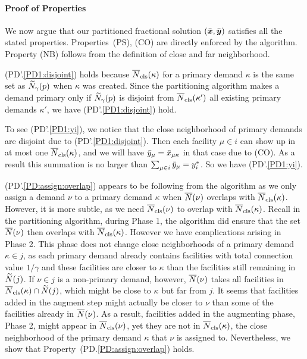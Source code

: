 
\medskip
\paragraph{Proof of Properties}
We now argue that our partitioned fractional solution $(\bar{\boldsymbol{x}},\bar{\boldsymbol{y}})$
satisfies all the stated properties. Properties~(PS), (CO) are
directly enforced by the algorithm. Property (NB) follows from the
definition of close and far neighborhood.

(PD'.\ref{PD1:disjoint}) holds because ${\overline{N}}_{\text{cls}}(\kappa)$ for a
primary demand $\kappa$ is the same set as ${\widetilde N}_{\gamma}(p)$ when
$\kappa$ was created. Since the partitioning algorithm makes a demand
primary only if ${\widetilde N}_{\gamma}(p)$ is disjoint from
${\overline{N}}_{\text{cls}}(\kappa')$ all existing primary demands $\kappa'$, we have
(PD'.\ref{PD1:disjoint}) hold.

To see (PD'.\ref{PD1:yi}), we notice that the close neighborhood of
primary demands are disjoint due to (PD'.\ref{PD1:disjoint}). Then
each facility $\mu \in i$ can show up in at most one
${\overline{N}}_{\text{cls}}(\kappa)$, and we will have ${\bar y}_{\mu} =
{\bar x}_{\mu\kappa}$ in that case due to (CO). As a result this
summation is no larger than $\sum_{\mu\in i}{\bar y}_{\mu} =
y_i^\ast$. So we have (PD'.\ref{PD1:yi}).

(PD'.\ref{PD:assign:overlap}) appears to be following from the
algorithm as we only assign a demand $\nu$ to a primary demand
$\kappa$ when ${\overline{N}}(\nu)$ overlaps with
${\overline{N}}_{\text{cls}}(\kappa)$. However, it is more subtle, as we need
${\overline{N}}_{\text{cls}}(\nu)$ to overlap with ${\overline{N}}_{\text{cls}}(\kappa)$. Recall in the
partitioning algorithm, during Phase 1, the algorithm did ensure that
the set ${\overline{N}}(\nu)$ then overlaps with ${\overline{N}}_{\text{cls}}(\kappa)$. However
we have complications arising in Phase 2. This phase does not change
close neighborhoods of a primary demand $\kappa\in j$, as each primary
demand already contains facilities with total connection value
$1/\gamma$ and these facilities are closer to $\kappa$ than the
facilities still remaining in ${\widetilde N}(j)$. If $\nu\in j$ is a
non-primary demand, however, ${\overline{N}}(\nu)$ takes all facilities in
${\overline{N}}_{\text{cls}}(\kappa)\cap {\widetilde N}(j)$, which might be close to $\kappa$
but far from $j$.  It seems that facilities added in the augment step
might actually be closer to $\nu$ than some of the facilities already
in ${\overline{N}}(\nu)$. As a result, facilities added in the augmenting
phase, Phase 2, might appear in ${\overline{N}}_{\text{cls}}(\nu)$, yet they are not in
${\overline{N}}_{\text{cls}}(\kappa)$, the close neighborhood of the primary demand
$\kappa$ that $\nu$ is assigned to.  Nevertheless, we show that
Property~(PD.\ref{PD:assign:overlap}) holds.

